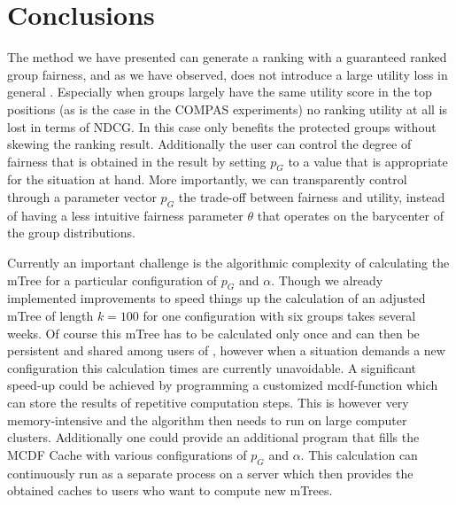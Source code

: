 \section{Conclusions}\label{sec:conclusions}

The method we have presented can generate a ranking with a guaranteed ranked group fairness, and as we have observed, does not introduce a large utility loss in general .
%
Especially when groups largely have the same utility score in the top positions (as is the case in the COMPAS experiments) no ranking utility at all is lost in terms of NDCG. 
%
In this case \algoFAIR only benefits the protected groups without skewing the ranking result.
%
Additionally the user can control the degree of fairness that is obtained in the result by setting $p_G$ to a value that is appropriate for the situation at hand.
%
%
More importantly, we can transparently control through a parameter vector $p_G$ the trade-off between fairness and utility, instead of having a less intuitive fairness parameter $\theta$ that operates on the barycenter of the group distributions.


Currently an important challenge is the algorithmic complexity of calculating the mTree for a particular configuration of $p_G$ and $\alpha$.
%
Though we already implemented improvements to speed things up the calculation of an adjusted mTree of length $k=100$ for one configuration with six groups takes several weeks.
%
Of course this mTree has to be calculated only once and can then be persistent and shared among users of \algoFAIR, however when a situation demands a new configuration this calculation times are currently unavoidable.
%
A significant speed-up could be achieved by programming a customized mcdf-function which can store the results of repetitive computation steps. 
%
This is however very memory-intensive and the algorithm then needs to run on large computer clusters.
%
Additionally one could provide an additional program that fills the MCDF Cache with various configurations of $p_G$ and $\alpha$.
%
This calculation can continuously run as a separate process on a server which then provides the obtained caches to users who want to compute new mTrees.

